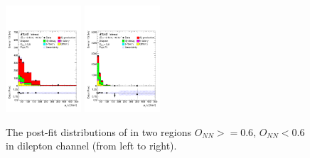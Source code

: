 \begin{figure}[ht]
  \centering
  \includegraphics[width=0.25\textwidth]{figures/diff_xsec/dilep/post_fit/tty2l_pt_all_syst/Plots/SR1_postFit.pdf}%
  \includegraphics[width=0.25\textwidth]{figures/diff_xsec/dilep/post_fit/tty2l_pt_all_syst/Plots/SR2_postFit.pdf}%
  \caption{The post-fit distributions of \ptgamma in two regions $O_{NN}>=0.6$, $O_{NN}<0.6$ in dilepton channel (from left to right).}
  \label{fig:pt_postfit_dilep_realdata}
\end{figure}
\FloatBarrier


